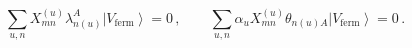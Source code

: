 \begin{equation}\label{fermcomp}
\sum_{u,n}X^{(u)}_{mn}\lambda_{n(u)}^A\left|V_{\mbox{ferm}}\right>=0\,,\qquad
\sum_{u,n}\alpha_uX^{(u)}_{mn}\theta_{n(u)A}\left|V_{\mbox{ferm}}\right>=0\,.
\end{equation}

